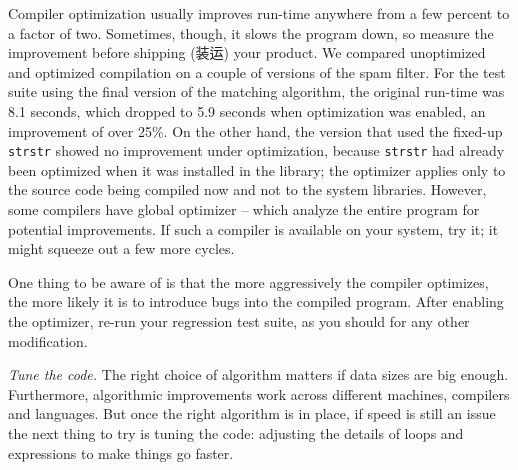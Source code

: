 Compiler optimization usually improves run-time anywhere from a few percent
to a factor of two. Sometimes, though, it slows the program down, so
measure the improvement before shipping (装运) your product. We compared
unoptimized and optimized compilation on a couple of versions of the spam
filter. For the test suite using the final version of the matching
algorithm, the original run-time was 8.1 seconds, which dropped to 5.9
seconds when optimization was enabled, an improvement of over 25\%. On the
other hand, the version that used the fixed-up \verb'strstr' showed no
improvement under optimization, because \verb'strstr' had already been
optimized when it was installed in the library; the optimizer applies only
to the source code being compiled now and not to the system libraries.
However, some compilers have global optimizer -- which analyze the entire
program for potential improvements. If such a compiler is available on your
system, try it; it might squeeze out a few more cycles.

One thing to be aware of is that the more aggressively the compiler
optimizes, the more likely it is to introduce bugs into the compiled
program. After enabling the optimizer, re-run your regression test suite,
as you should for any other modification.

\emph{Tune the code.} The right choice of algorithm matters if data sizes
are big enough. Furthermore, algorithmic improvements work across different
machines, compilers and languages. But once the right algorithm is in
place, if speed is still an issue the next thing to try is tuning the code:
adjusting the details of loops and expressions to make things go faster.

